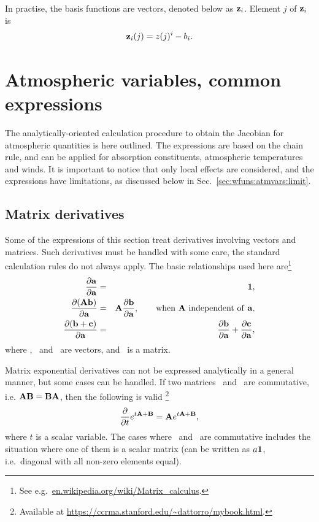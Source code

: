 In practise, the basis functions are vectors, denoted below as $\mathbf{z}_i$.
Element $j$ of $\mathbf{z}_i$ is
\begin{equation}
  \mathbf{z}_i(j) = z(j)^i - b_i.
\end{equation}




\section{Atmospheric variables, common expressions}
\label{sec:wfuns:atmvars}
%
The analytically-oriented calculation procedure to obtain the Jacobian for
atmospheric quantities is here outlined. The expressions are based on the
chain rule, and can be applied for absorption constituents, atmospheric
temperatures and winds. It is important to notice that only local effects are
considered, and the expressions have limitations, as discussed below in
Sec.~\ref{sec:wfuns:atmvars:limit}.


\subsection{Matrix derivatives}
\label{sec:wfuns:atmvars:matder}
%
Some of the expressions of this section treat derivatives involving vectors
and matrices. Such derivatives must be handled with some care, the standard
calculation rules do not always apply. The basic relationships used here
are\footnote{See e.g.\ \url{en.wikipedia.org/wiki/Matrix_calculus}.}
\begin{eqnarray}
  \frac{\partial\mathbf{a}}{\partial\mathbf{a}} &=& 
    \mathbf{1}, \\
  \frac{\partial(\mathbf{A}\mathbf{b})}{\partial\mathbf{a}} &=& 
    \mathbf{A}\frac{\partial\mathbf{b}}{\partial\mathbf{a}}, \quad\quad
    \mathrm{when}\ \mathbf{A}\ \mathrm{independent\ of}\ \mathbf{a},\\
  \frac{\partial(\mathbf{b}+\mathbf{c})}{\partial\mathbf{a}} &=& 
    \frac{\partial\mathbf{b}}{\partial\mathbf{a}}+
    \frac{\partial\mathbf{c}}{\partial\mathbf{a}},
\end{eqnarray}
where , \ and \ are vectors, and \ is a
matrix.

Matrix exponential derivatives can not be expressed analytically in a general
manner, but some cases can be handled. If two matrices \ and
\ are commutative, i.e. $\mathbf{A}\mathbf{B}=\mathbf{B}\mathbf{A}$,
then the following is valid \citep{Dattorro2011}\footnote{Available at
  \url{https://ccrma.stanford.edu/~dattorro/mybook.html}.}
\begin{equation}
  \label{eq:expmder}
  \frac{\partial}{\partial t} e^{t\mathbf{A}+\mathbf{B}} = 
       \mathbf{A}e^{t\mathbf{A}+\mathbf{B}},
\end{equation}
where $t$ is a scalar variable.
The cases where \ and \ are commutative includes the
situation where one of them is a scalar matrix (can be written as $a\mathbf{1}$,
i.e.\ diagonal with all non-zero elements equal).




